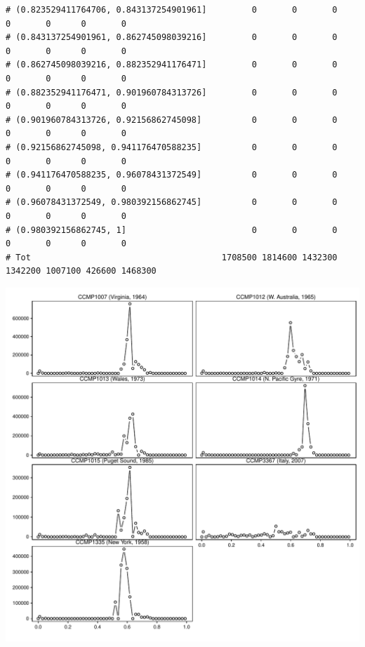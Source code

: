 \documentclass{article}\usepackage[]{graphicx}\usepackage[]{color}
\makeatletter
\def\maxwidth{ %
  \ifdim\Gin@nat@width>\linewidth
    \linewidth
  \else
    \Gin@nat@width
  \fi
}
\newenvironment{kframe}{%
 \def\at@end@of@kframe{}%
 \ifinner\ifhmode%
  \def\at@end@of@kframe{\end{minipage}}%
  \begin{minipage}{\columnwidth}%
 \fi\fi%
 \def\FrameCommand##1{\hskip\@totalleftmargin \hskip-\fboxsep
 \colorbox{shadecolor}{##1}\hskip-\fboxsep
     \hskip-\linewidth \hskip-\@totalleftmargin \hskip\columnwidth}%
 \MakeFramed {\advance\hsize-\width
   \@totalleftmargin\z@ \linewidth\hsize
   \@setminipage}}%
 {\par\unskip\endMakeFramed%
 \at@end@of@kframe}
\newenvironment{knitrout}{}{} %
\makeatother
\begin{document}
\begin{knitrout}
\begin{kframe}
\begin{verbatim}
# (0.823529411764706, 0.843137254901961]         0       0       0       0       0      0       0
# (0.843137254901961, 0.862745098039216]         0       0       0       0       0      0       0
# (0.862745098039216, 0.882352941176471]         0       0       0       0       0      0       0
# (0.882352941176471, 0.901960784313726]         0       0       0       0       0      0       0
# (0.901960784313726, 0.92156862745098]          0       0       0       0       0      0       0
# (0.92156862745098, 0.941176470588235]          0       0       0       0       0      0       0
# (0.941176470588235, 0.96078431372549]          0       0       0       0       0      0       0
# (0.96078431372549, 0.980392156862745]          0       0       0       0       0      0       0
# (0.980392156862745, 1]                         0       0       0       0       0      0       0
# Tot                                      1708500 1814600 1432300 1342200 1007100 426600 1468300
\end{verbatim}
\end{kframe}

{\centering \includegraphics[width=\maxwidth]{figs-knitr/unnamed-chunk-31-1} 

}



\end{knitrout}
\end{document}
